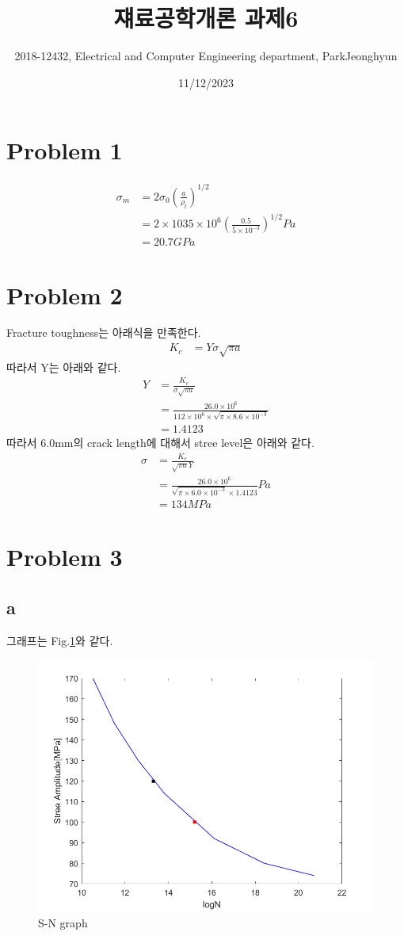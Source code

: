 \documentclass[a4paper]{oblivoir}
\title{쟤료공학개론 과제6}
\author{2018-12432, Electrical and Computer Engineering department, ParkJeonghyun}
\date{11/12/2023}
\begin{document}
\maketitle
\section{Problem 1}
\begin{align}
	\sigma_{m} &= 2\sigma_{0}\left( \frac{a}{\rho_{t}} \right)^{1/2}\\
	&= 2\times 1035 \times 10^{6}\left( \frac{0.5}{5\times10^{-3}} \right)^{1/2} Pa\\
	&= 20.7 GPa
\end{align}

\section{Problem 2}
Fracture toughness는 아래식을 만족한다.
\begin{align}
	K_{c} &= Y\sigma\sqrt{\pi a}
\end{align}
따라서 Y는 아래와 같다.
\begin{align}
	Y &= \frac{K_{c}}{\sigma\sqrt{\pi a}}\\
	&= \frac{26.0\times 10^{6}}{112 \times 10^{6}\times\sqrt{\pi \times 8.6\times10^{-3}}} \\
	&=1.4123
\end{align}
따라서 6.0mm의 crack length에 대해서 stree level은 아래와 같다.
\begin{align}
	\sigma &= \frac{K_{c}}{\sqrt{\pi a}Y}\\
	&= \frac{26.0\times 10^{6}}{\sqrt{\pi \times 6.0\times10^{-3}}\times1.4123}Pa\\
	&= 134 MPa
\end{align}

\section{Problem 3}
\subsection{a}
그래프는 Fig.\ref{fig:pro3}와 같다.
\begin{figure}[htbp]
	\begin{centering}
	\includegraphics[width = 0.75\linewidth]{pro3.png}%
	\caption{\label{fig:pro3} S-N graph}
	\end{centering}
\end{figure}
\end{document}
